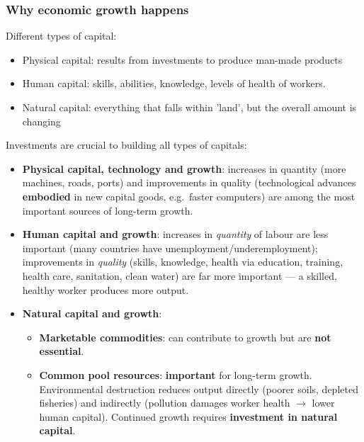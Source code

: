 \documentclass[a4paper,12pt]{article}
\begin{document}
\subsubsection*{Why economic growth happens}
Different types of capital:
\begin{itemize}
  \item Physical capital: results from investments to produce man-made products
  \item Human capital: skills, abilities, knowledge, levels of health of workers.
  \item Natural capital: everything that falls within 'land', but the overall amount is changing
\end{itemize}
Investments are crucial to building all types of capitals:
\begin{itemize}
  \item \textbf{Physical capital, technology and growth}: increases in quantity (more machines, roads, ports) and improvements in quality (technological advances \textbf{embodied} in new capital goods, e.g.\ faster computers) are among the most important sources of long-term growth.
  \item \textbf{Human capital and growth}: increases in \textit{quantity} of labour are less important (many countries have unemployment/underemployment); improvements in \textit{quality} (skills, knowledge, health via education, training, health care, sanitation, clean water) are far more important --- a skilled, healthy worker produces more output.
  \item \textbf{Natural capital and growth}:
  \begin{itemize}
    \item \textbf{Marketable commodities}: can contribute to growth but are \textbf{not essential}.
    \item \textbf{Common pool resources}: \textbf{important} for long-term growth. Environmental destruction reduces output directly (poorer soils, depleted fisheries) and indirectly (pollution damages worker health $\to$ lower human capital). Continued growth requires \textbf{investment in natural capital}.
  \end{itemize}
\end{itemize}
\end{document}
